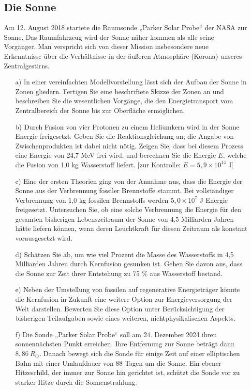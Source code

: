 \begin{aufgabe}
\begin{enumerate}[resume]
    \section*{Die Sonne} 
    Am 12. August 2018 startete die Raumsonde „Parker Solar Probe“ der NASA zur Sonne. Das Raumfahrzeug wird der Sonne näher kommen als alle seine Vorgänger. Man verspricht sich von dieser Mission insbesondere neue Erkenntnisse über die Verhältnisse in der äußeren Atmosphäre (Korona) unseres Zentralgestirns. 
    \begin{enumerate} 
        \item[a)] In einer vereinfachten Modellvorstellung lässt sich der Aufbau der Sonne in Zonen gliedern. Fertigen Sie eine beschriftete Skizze der Zonen an und beschreiben Sie die wesentlichen Vorgänge, die den Energietransport vom Zentralbereich der Sonne bis zur Oberfläche ermöglichen. 
        \item[b)] Durch Fusion von vier Protonen zu einem Heliumkern wird in der Sonne Energie freigesetzt. Geben Sie die Reaktionsgleichung an; die Angabe von Zwischenprodukten ist dabei nicht nötig. Zeigen Sie, dass bei diesem Prozess eine Energie von 24,7 MeV frei wird, und berechnen Sie die Energie $E$, welche die Fusion von 1,0 kg Wasserstoff liefert. [zur Kontrolle: $E = 5,9 \times 10^{14}$ J] 
        \item[c)] Eine der ersten Theorien ging von der Annahme aus, dass die Energie der Sonne aus der Verbrennung fossiler Brennstoffe stammt. Bei vollständiger Verbrennung von 1,0 kg fossilen Brennstoffs werden $5,0 \times 10^7$ J Energie freigesetzt. Untersuchen Sie, ob eine solche Verbrennung die Energie für den gesamten bisherigen Lebenszeitraum der Sonne von 4,5 Milliarden Jahren hätte liefern können, wenn deren Leuchtkraft für diesen Zeitraum als konstant vorausgesetzt wird. 
        \item[d)] Schätzen Sie ab, um wie viel Prozent die Masse des Wasserstoffs in 4,5 Milliarden Jahren durch Kernfusion gesunken ist. Gehen Sie davon aus, dass die Sonne zur Zeit ihrer Entstehung zu 75 \% aus Wasserstoff bestand. 
        \item[e)] Neben der Umstellung von fossilen auf regenerative Energieträger könnte die Kernfusion in Zukunft eine weitere Option zur Energieversorgung der Welt darstellen. Bewerten Sie diese Option unter Berücksichtigung der bisherigen Teilaufgaben sowie eines weiteren, nichtphysikalischen Aspekts. 
        \item[f)] Die Sonde „Parker Solar Probe“ soll am 24. Dezember 2024 ihren sonnennächsten Punkt erreichen. Ihre Entfernung zur Sonne beträgt dann $8,86 \ R_\odot$. Danach bewegt sich die Sonde für einige Zeit auf einer elliptischen Bahn mit einer Umlaufdauer von 88 Tagen um die Sonne. Ein ebener Hitzeschild, der immer zur Sonne hin gerichtet ist, schützt die Sonde vor zu starker Hitze durch die Sonnenstrahlung. 

\end{enumerate}
\end{enumerate}
\end{aufgabe}
